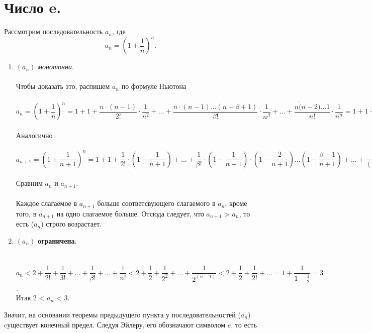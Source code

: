 \section{Число e.}
Рассмотрим последовательность $a_{n}$, где
$$a_{n} = (1 + \dfrac{1}{n})^n.$$
\begin{enumerate}
	\item $(a_{n})$ \textit{монотонна}.\\\\ Чтобы доказать это, распишем $a_{n}$ по формуле Ньютона\\
	\\$a_{n} = (1 + \dfrac{1}{n})^n  = 1 + 1 + \dfrac{n\cdot(n -1)}{2!}\cdot\dfrac{1}{n^2} + \ldots + \dfrac{n\cdot(n - 1)\dots(n- \beta + 1)}{\beta!}\cdot\dfrac{1}{n^\beta} + \ldots + \dfrac{n\dot(n-2)\dots 1}{n!}\cdot\dfrac{1}{n^n} = 1 + 1 + \dfrac{1}{2!} \cdot(1 - \dfrac{1}{n}) + \ldots + \dfrac{1}{\beta!}\cdot(1-\dfrac{1}{n})\cdot(1-\dfrac{2}{n})\dots(1-\dfrac{\beta - 1}{n}) + \ldots + \dfrac{1}{n!}\cdot(1-\dfrac{1}{n})\cdot(1-\dfrac{2}{n}) \dots (1-\dfrac{n - 1}{n})$\\
	\\
	Аналогично\\
	\\$a_{n+1} =(1 + \dfrac{1}{n + 1})^n = 1 + 1 + \dfrac{1}{2!} \cdot(1 - \dfrac{1}{n + 1}) + \ldots + \dfrac{1}{\beta!}\cdot(1-\dfrac{1}{n + 1})\cdot(1-\dfrac{2}{n + 1})\dots(1-\dfrac{\beta - 1}{n + 1}) + \ldots + \dfrac{1}{(n + 1)!}\cdot(1-\dfrac{1}{n + 1}) \dots (1-\dfrac{n}{n +1}) $\\
	\\
	Сравним $a_{n}$ и $a_{n + 1}$.\\\\
	Каждое слагаемое в $a_{n + 1}$ больше соответсвующего слагаемого в $a_{n}$, кроме того, в $a_{n + 1}$ на одно слагаемое больше. Отсюда следует, что $a_{n + 1} $ > $a_{n}$, то есть ($a_{n}$) строго возрастает.
	\item $(a_{n})$ \textbf{ограничена}.\\\\
	\\$a_{n} < 2 + \dfrac{1}{2!} + \dfrac{1}{3!} + \dots + \dfrac{1}{\beta!} + \dots + \dfrac{1}{n!} < 2 + \dfrac{1}{2} + \dfrac{1}{2^2}+ \ldots + \dfrac{1}{2^{(n - 1)}} < 2 + \dfrac{1}{2} + \dfrac{1}{2!} + \ldots = 1 + \dfrac{1}{1- \frac{1}{2}} = 3$.\\
	Итак 2 < $a_{n }$ < 3.\\
\end{enumerate}
Значит, на основании теоремы предыдущего пункта у последовательностей ($a_{n}$) cуществует конечный предел. Следуя Эйлеру, его обозначают символом $e$, то есть

